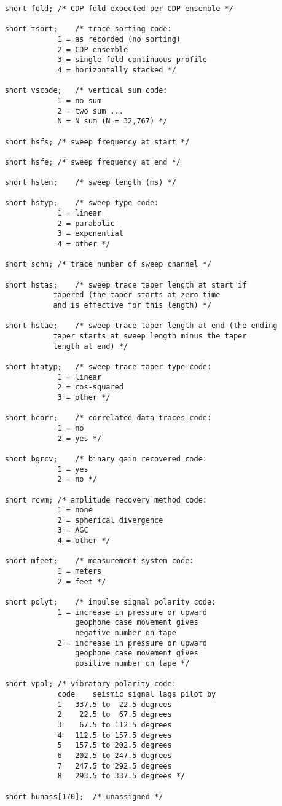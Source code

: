 {\begin{verbatim}
	short fold;	/* CDP fold expected per CDP ensemble */

	short tsort;	/* trace sorting code: 
				1 = as recorded (no sorting)
				2 = CDP ensemble
				3 = single fold continuous profile
				4 = horizontally stacked */

	short vscode;	/* vertical sum code:
				1 = no sum
				2 = two sum ...
				N = N sum (N = 32,767) */

	short hsfs;	/* sweep frequency at start */

	short hsfe;	/* sweep frequency at end */

	short hslen;	/* sweep length (ms) */

	short hstyp;	/* sweep type code:
				1 = linear
				2 = parabolic
				3 = exponential
				4 = other */

	short schn;	/* trace number of sweep channel */

	short hstas;	/* sweep trace taper length at start if
			   tapered (the taper starts at zero time
			   and is effective for this length) */

	short hstae;	/* sweep trace taper length at end (the ending
			   taper starts at sweep length minus the taper
			   length at end) */

	short htatyp;	/* sweep trace taper type code:
				1 = linear
				2 = cos-squared
				3 = other */

	short hcorr;	/* correlated data traces code:
				1 = no
				2 = yes */

	short bgrcv;	/* binary gain recovered code:
				1 = yes
				2 = no */

	short rcvm;	/* amplitude recovery method code:
				1 = none
				2 = spherical divergence
				3 = AGC
				4 = other */

	short mfeet;	/* measurement system code:
				1 = meters
				2 = feet */

	short polyt;	/* impulse signal polarity code:
				1 = increase in pressure or upward
				    geophone case movement gives
				    negative number on tape
				2 = increase in pressure or upward
				    geophone case movement gives
				    positive number on tape */

	short vpol;	/* vibratory polarity code:
				code	seismic signal lags pilot by
				1	337.5 to  22.5 degrees
				2	 22.5 to  67.5 degrees
				3	 67.5 to 112.5 degrees
				4	112.5 to 157.5 degrees
				5	157.5 to 202.5 degrees
				6	202.5 to 247.5 degrees
				7	247.5 to 292.5 degrees
				8	293.5 to 337.5 degrees */

	short hunass[170];	/* unassigned */


\end{verbatim}}
